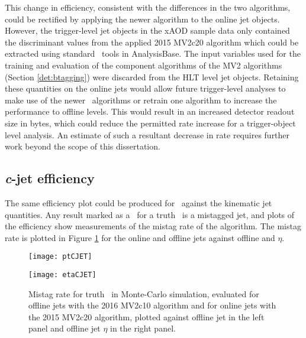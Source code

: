 		This change in efficiency, consistent with the differences in the two algorithms, could be rectified by applying the newer algorithm to the online jet objects. However, the trigger-level jet objects in the xAOD sample data only contained the discriminant values from the applied 2015 MV2c20 algorithm which could be extracted using standard \btag\ tools in AnalysisBase. The input variables used for the training and evaluation of the component algorithms of the MV2 algorithms (Section \ref{det:btagging}) were discarded from the HLT level jet objects. Retaining these quantities on the online jets would allow future trigger-level analyses to make use of the newer \btag\ algorithms or retrain one algorithm to increase the performance to offline levels. This would result in an increased detector readout size in bytes, which could reduce the permitted rate increase for a trigger-object level analysis. An estimate of such a resultant decrease in rate requires further work beyond the scope of this dissertation.

	\subsection{\textit{c}-jet efficiency}
	The same efficiency plot could be produced for \cjets\, against the kinematic jet quantities. Any result marked as a \bjet\ for a truth \cjet\ is a mistagged jet, and plots of the efficiency show measurements of the mistag rate of the algorithm. The mistag rate is plotted in Figure \ref{fig:MC:cjetefficiency} for the online and offline jets against offline \pt and $\eta$.
		\begin{figure}[h]
			\centering
			\begin{minipage}[h]{0.48\linewidth}
				\texttt{[image: ptCJET]}

			\end{minipage}
			\quad
			\begin{minipage}[h]{0.48\linewidth}
				\texttt{[image: etaCJET]}
			\end{minipage}
			\caption[Comparison of mistag rate between online and offline truth \cjets\ in Monte-Carlo simulation]{Mistag rate for truth \cjets\, in Monte-Carlo simulation, evaluated for offline jets with the 2016 MV2c10 algorithm and for online jets with the 2015 MV2c20 algorithm, plotted against offline jet \pt in the left panel and offline jet $\eta$ in the right panel.}
			\label{fig:MC:cjetefficiency}
		\end{figure}

